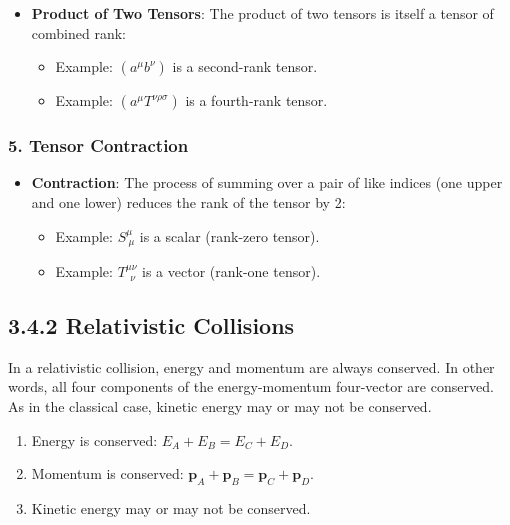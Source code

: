 \documentclass[12pt]{book}
\begin{document}
                \begin{itemize}
                    \item \textbf{Product of Two Tensors}: The product of two tensors is itself a tensor of combined rank:
                    \begin{itemize}
                        \item Example: \( (a^\mu b^\nu) \) is a second-rank tensor.
                        \item Example: \( (a^\mu T^{\nu \rho \sigma}) \) is a fourth-rank tensor.
                    \end{itemize}
                \end{itemize}
            
            \subsubsection*{5. Tensor Contraction}
            
                \begin{itemize}
                    \item \textbf{Contraction}: The process of summing over a pair of like indices (one upper and one lower) reduces the rank of the tensor by 2:
                    \begin{itemize}
                        \item Example: \( S^\mu_{\ \mu} \) is a scalar (rank-zero tensor).
                        \item Example: \( T^{\mu \nu}_{\ \ \nu} \) is a vector (rank-one tensor).
                    \end{itemize}
                \end{itemize}

        \subsection{3.4.2 Relativistic Collisions}
            In a relativistic collision, energy and momentum are always conserved. In other words, all four components of the energy-momentum four-vector are conserved. As in the classical case, kinetic energy may or may not be conserved.
            
            \begin{enumerate}
                \item Energy is conserved: \( E_A + E_B = E_C + E_D \).
                \item Momentum is conserved: \( \mathbf{p}_A + \mathbf{p}_B = \mathbf{p}_C + \mathbf{p}_D \).
                \item Kinetic energy may or may not be conserved.
            \end{enumerate}
            
\end{document}
